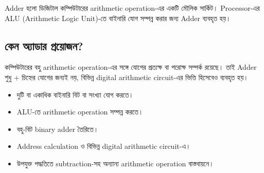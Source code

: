 \textenglish{Adder} হলো ডিজিটাল কম্পিউটারের
\textenglish{arithmetic operation}-এর একটি মৌলিক সার্কিট।
\textenglish{Processor}-এর
\textenglish{ALU (Arithmetic Logic Unit)}-তে বাইনারি যোগ সম্পন্ন করার
জন্য \textenglish{Adder} ব্যবহৃত হয়।

\begin{center}
\begin{chThreeDiagram}
\end{chThreeDiagram}
\end{center}



\subsection{কেন অ্যাডার প্রয়োজন?}

কম্পিউটারের বহু \textenglish{arithmetic operation}-এর সঙ্গে যোগের প্রত্যক্ষ
বা পরোক্ষ সম্পর্ক রয়েছে। তাই \textenglish{Adder} শুধু \(+\) চিহ্নের যোগের
জন্যই নয়, বিভিন্ন \textenglish{digital arithmetic circuit}-এর ভিত্তি
হিসেবেও ব্যবহৃত হয়।

\begin{itemize}[label={{\bulletfont\textbullet}}, leftmargin=*, nosep]

\item দুটি বা একাধিক বাইনারি বিট বা সংখ্যা যোগ করতে।

\item \textenglish{ALU}-তে
\textenglish{arithmetic operation} সম্পন্ন করতে।

\item বহু-বিট \textenglish{binary adder} তৈরিতে।

\item \textenglish{Address calculation} ও বিভিন্ন
\textenglish{digital arithmetic circuit}-এ।

\item উপযুক্ত পদ্ধতিতে \textenglish{subtraction}-সহ অন্যান্য
\textenglish{arithmetic operation} বাস্তবায়নে।

\end{itemize}


